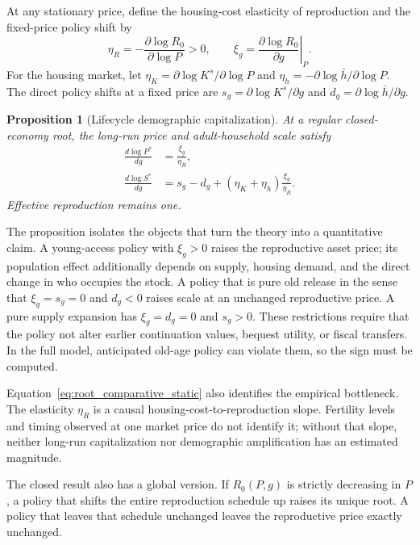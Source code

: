 \documentclass[11pt]{article}
\newtheorem{proposition}{Proposition}
\theoremstyle{definition}
\newcommand{\1}{\mathbf 1}
\begin{document}
At any stationary price, define the housing-cost elasticity of reproduction
and the fixed-price policy shift by
\begin{equation}
 \eta_R=-\frac{\partial\log R_0}{\partial\log P}>0,
 \qquad
 \xi_g=\left.\frac{\partial\log R_0}{\partial g}\right|_P.
 \label{eq:reproduction_sufficient_statistics}
\end{equation}
For the housing market, let $\eta_K=\partial\log K^s/\partial\log P$ and
$\eta_h=-\partial\log\bar h/\partial\log P$. The direct policy shifts at a
fixed price are $s_g=\partial\log K^s/\partial g$ and
$d_g=\partial\log\bar h/\partial g$.

\begin{proposition}[Lifecycle demographic capitalization]
\label{prop:lifecycle_capitalization}
At a regular closed-economy root, the long-run price and adult-household scale
satisfy
\begin{align}
 \frac{d\log P^*}{dg}
 &=\frac{\xi_g}{\eta_R},
 \label{eq:root_comparative_static}\\
 \frac{d\log S^*}{dg}
 &=s_g-d_g
   +(\eta_K+\eta_h)\frac{\xi_g}{\eta_R}.
 \label{eq:scale_sufficient_statistics}
\end{align}
Effective reproduction remains one.
\end{proposition}

The proposition isolates the objects that turn the theory into a quantitative
claim. A young-access policy with $\xi_g>0$ raises the reproductive asset price;
its population effect additionally depends on supply, housing demand, and the
direct change in who occupies the stock. A policy that is pure old release in
the sense that $\xi_g=s_g=0$ and $d_g<0$ raises scale at an unchanged
reproductive price. A pure supply expansion has $\xi_g=d_g=0$ and $s_g>0$.
These restrictions require that the policy not alter earlier continuation
values, bequest utility, or fiscal transfers. In the full model, anticipated
old-age policy can violate them, so the sign must be computed.

Equation~\eqref{eq:root_comparative_static} also identifies the empirical
bottleneck. The elasticity $\eta_R$ is a causal housing-cost-to-reproduction
slope. Fertility levels and timing observed at one market price do not identify
it; without that slope, neither long-run capitalization nor demographic
amplification has an estimated magnitude.

The closed result also has a global version. If $R_0(P,g)$ is strictly
decreasing in $P$, a policy that shifts the entire reproduction schedule up
raises its unique root. A policy that leaves that schedule unchanged leaves
the reproductive price exactly unchanged.
\end{document}
